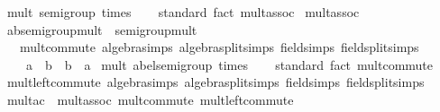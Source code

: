 \begin{isabellebody}
\isanewline
\isanewline
{}\isamarkupfalse%
\ mult{\isacharcolon}{\kern0pt}\ semigroup\ times\isanewline
%
\isadelimproof
\ \ %
\endisadelimproof
%
\isatagproof
{}\isamarkupfalse%
\ standard\ {\isacharparenleft}{\kern0pt}fact\ mult{\isacharunderscore}{\kern0pt}assoc{\isacharparenright}{\kern0pt}%
\endisatagproof
{\isafoldproof}%
%
\isadelimproof
\isanewline
%
\endisadelimproof
\isanewline
{}\isamarkupfalse%
\isanewline
\isanewline
{}\isamarkupfalse%
\ mult{\isacharunderscore}{\kern0pt}assoc\isanewline
\isanewline
{}\isamarkupfalse%
\ ab{\isacharunderscore}{\kern0pt}semigroup{\isacharunderscore}{\kern0pt}mult\ {\isacharequal}{\kern0pt}\ semigroup{\isacharunderscore}{\kern0pt}mult\ {\isacharplus}{\kern0pt}\isanewline
\ \ \ mult{\isacharunderscore}{\kern0pt}commute\ {\isacharbrackleft}{\kern0pt}algebra{\isacharunderscore}{\kern0pt}simps{\isacharcomma}{\kern0pt}\ algebra{\isacharunderscore}{\kern0pt}split{\isacharunderscore}{\kern0pt}simps{\isacharcomma}{\kern0pt}\ field{\isacharunderscore}{\kern0pt}simps{\isacharcomma}{\kern0pt}\ field{\isacharunderscore}{\kern0pt}split{\isacharunderscore}{\kern0pt}simps{\isacharbrackright}{\kern0pt}{\isacharcolon}{\kern0pt}\isanewline
\ \ \ \ {\isachardoublequoteopen}a\ {\isacharasterisk}{\kern0pt}\ b\ {\isacharequal}{\kern0pt}\ b\ {\isacharasterisk}{\kern0pt}\ a{\isachardoublequoteclose}\isanewline
{}\isanewline
\isanewline
{}\isamarkupfalse%
\ mult{\isacharcolon}{\kern0pt}\ abel{\isacharunderscore}{\kern0pt}semigroup\ times\isanewline
%
\isadelimproof
\ \ %
\endisadelimproof
%
\isatagproof
{}\isamarkupfalse%
\ standard\ {\isacharparenleft}{\kern0pt}fact\ mult{\isacharunderscore}{\kern0pt}commute{\isacharparenright}{\kern0pt}%
\endisatagproof
{\isafoldproof}%
%
\isadelimproof
\isanewline
%
\endisadelimproof
\isanewline
{}\isamarkupfalse%
\ mult{\isachardot}{\kern0pt}left{\isacharunderscore}{\kern0pt}commute\ {\isacharbrackleft}{\kern0pt}algebra{\isacharunderscore}{\kern0pt}simps{\isacharcomma}{\kern0pt}\ algebra{\isacharunderscore}{\kern0pt}split{\isacharunderscore}{\kern0pt}simps{\isacharcomma}{\kern0pt}\ field{\isacharunderscore}{\kern0pt}simps{\isacharcomma}{\kern0pt}\ field{\isacharunderscore}{\kern0pt}split{\isacharunderscore}{\kern0pt}simps{\isacharbrackright}{\kern0pt}\isanewline
\isanewline
{}\isamarkupfalse%
\ mult{\isacharunderscore}{\kern0pt}ac\ {\isacharequal}{\kern0pt}\ mult{\isachardot}{\kern0pt}assoc\ mult{\isachardot}{\kern0pt}commute\ mult{\isachardot}{\kern0pt}left{\isacharunderscore}{\kern0pt}commute\isanewline

\end{isabellebody}
